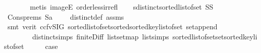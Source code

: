 \begin{isabellebody}
\ {}\isanewline
\ \ \ \ \isamarkupfalse%
\ {\isacharparenleft}{\kern0pt}metis\ imageE\ order{\isacharunderscore}{\kern0pt}less{\isacharunderscore}{\kern0pt}irrefl{\isacharparenright}{\kern0pt}\isanewline
\ \ \isamarkupfalse%
\ {\isachardoublequoteopen}sdistinct{\isacharparenleft}{\kern0pt}sorted{\isacharunderscore}{\kern0pt}list{\isacharunderscore}{\kern0pt}of{\isacharunderscore}{\kern0pt}set\ {\isacharparenleft}{\kern0pt}S{}{\isasymunion}S{}{\isacharparenright}{\kern0pt}{\isacharparenright}{\kern0pt}{\isachardoublequoteclose}\ \isanewline
\ \ \ \ \isamarkupfalse%
\ Cons{\isachardot}{\kern0pt}prems{\isacharparenleft}{\kern0pt}{}{\isacharparenright}{\kern0pt}\ S{}a\ {\isachardoublequoteopen}{}{}{\isachardoublequoteclose}\ {\isachardoublequoteopen}{}{\isachardoublequoteclose}\ {\isachardoublequoteopen}{}{\isachardoublequoteclose}\ {\isachardoublequoteopen}{}{\isachardoublequoteclose}\ distinct{\isacharunderscore}{\kern0pt}def\ assms{\isacharparenleft}{\kern0pt}{}{\isacharparenright}{\kern0pt}\isanewline
\ \ \ \ \isamarkupfalse%
\ {\isacharparenleft}{\kern0pt}smt\ {\isacharparenleft}{\kern0pt}verit{\isacharcomma}{\kern0pt}\ ccfv{\isacharunderscore}{\kern0pt}SIG{\isacharparenright}{\kern0pt}\ sorted{\isacharunderscore}{\kern0pt}list{\isacharunderscore}{\kern0pt}of{\isacharunderscore}{\kern0pt}set{\isachardot}{\kern0pt}sorted{\isacharunderscore}{\kern0pt}sorted{\isacharunderscore}{\kern0pt}key{\isacharunderscore}{\kern0pt}list{\isacharunderscore}{\kern0pt}of{\isacharunderscore}{\kern0pt}set\ set{\isacharunderscore}{\kern0pt}append\isanewline
\ \ \ \ \ \ \ \ distinct{\isachardot}{\kern0pt}simps{\isacharparenleft}{\kern0pt}{}{\isacharparenright}{\kern0pt}\ finite{\isacharunderscore}{\kern0pt}Diff\ list{\isachardot}{\kern0pt}set{\isacharunderscore}{\kern0pt}map\ list{\isachardot}{\kern0pt}simps{\isacharparenleft}{\kern0pt}{}{\isacharparenright}{\kern0pt}\ sorted{\isacharunderscore}{\kern0pt}list{\isacharunderscore}{\kern0pt}of{\isacharunderscore}{\kern0pt}set{\isachardot}{\kern0pt}set{\isacharunderscore}{\kern0pt}sorted{\isacharunderscore}{\kern0pt}key{\isacharunderscore}{\kern0pt}list{\isacharunderscore}{\kern0pt}of{\isacharunderscore}{\kern0pt}set{\isacharparenright}{\kern0pt}\isanewline
\isanewline
\ \ \isamarkupfalse%
\ \isamarkupfalse%
\ {\isacharquery}{\kern0pt}case\ \isamarkupfalse%

\end{isabellebody}
